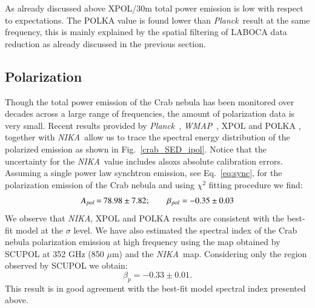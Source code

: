 \documentclass[twocolumn,traditabstract]{aa}
\def\NIKA{\textit{NIKA}}
\def\Planck{\textit{Planck}}
\def\WMAP{\textit{WMAP}}
\begin{document}
As already discussed above XPOL/30m total power emission is low with respect to expectations.
The POLKA value is found lower than \Planck\ result at the same frequency, this is mainly explained by the spatial filtering of LABOCA data reduction as already discussed in the previous section.
  

\subsection{Polarization}
Though the total power emission of the Crab nebula has been monitored over decades across a large range of frequencies, the amount of polarization data is
very small.
Recent results provided by
\Planck\ \citep{2015arXiv150702058P}, \WMAP\ \citep{2011ApJS..192...19W},
XPOL \citep{aumont2010} and POLKA \citep{2014PASP..126.1027W}, together with \NIKA\ allow us to trace the spectral energy distribution of the polarized emission as shown in Fig.~\ref{crab_SED_ipol}.  
Notice that the uncertainty for the \NIKA\ value includes alsoxs absolute calibration errors.  
Assuming a single power law synchtron emission, see Eq.~\ref{eq:sync}, for the polarization emission of the Crab nebula and using $\chi^2$ fitting procedure we find:
$$
\setlength\arraycolsep{0.1em}
 \begin{array}{rclcl}
  A_{pol}&=& 78.98\pm7.82 ; \quad \quad   \beta_{pol} = -0.35\pm0.03\\
 \end{array}
 $$
We observe that \NIKA, XPOL and POLKA results are consistent with the best-fit model at the $\sigma$ level.
We have also estimated the spectral index of the Crab nebula polarization
emission at high frequency using the map obtained by SCUPOL \citep{scubapol} at 352 GHz (850
$\mu$m) and the \NIKA\ map. Considering only the region observed by SCUPOL we
obtain:
\begin{equation}
\beta_p = -0.33 \pm 0.01.
\end{equation}
This result is in good agreement with the best-fit model spectral index presented above.
\end{document}
